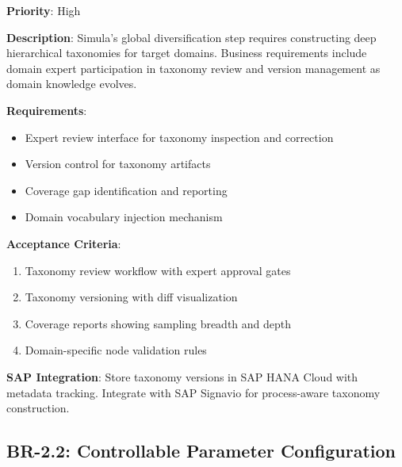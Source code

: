 \documentclass[12pt,a4paper,twoside]{report}
\begin{document}
\begin{tcolorbox}[colback=green!5,colframe=green!70,title=BR-2.1: Taxonomy Construction and Validation]
\textbf{Priority}: High

\textbf{Description}: Simula's global diversification step requires constructing
deep hierarchical taxonomies for target domains. Business requirements include
domain expert participation in taxonomy review and version management as domain
knowledge evolves.

\textbf{Requirements}:
\begin{itemize}
\item Expert review interface for taxonomy inspection and correction
\item Version control for taxonomy artifacts
\item Coverage gap identification and reporting
\item Domain vocabulary injection mechanism
\end{itemize}

\textbf{Acceptance Criteria}:
\begin{enumerate}
\item Taxonomy review workflow with expert approval gates
\item Taxonomy versioning with diff visualization
\item Coverage reports showing sampling breadth and depth
\item Domain-specific node validation rules
\end{enumerate}

\textbf{SAP Integration}: Store taxonomy versions in SAP HANA Cloud with metadata
tracking. Integrate with SAP Signavio for process-aware taxonomy construction.
\end{tcolorbox}

\subsection{BR-2.2: Controllable Parameter Configuration}
\end{document}
